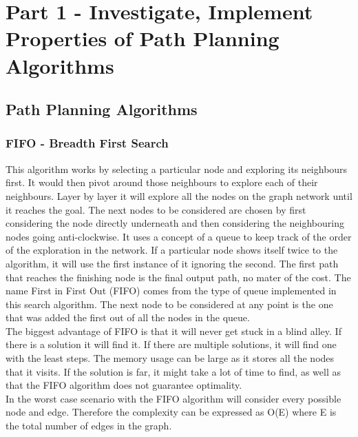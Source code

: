 \documentclass[a4paper,12pt]{article}
\begin{document}
	\pagebreak
	
	\tableofcontents
	
	\pagebreak
	
	\section{Part 1 - Investigate, Implement Properties of Path Planning Algorithms}
		
	\subsection{Path Planning Algorithms}

			\subsubsection{FIFO - Breadth First Search}

				This algorithm works by selecting a particular node and exploring its neighbours first. 
				It would then pivot around those neighbours to explore each of their neighbours. Layer by layer 
				it will explore all the nodes on the graph network until it reaches the goal. The next nodes to
				be considered are chosen by first considering the node directly underneath and then considering
				the neighbouring nodes going anti-clockwise. It uses a concept of a queue to keep track of the
				order of the exploration in the network. If a particular node shows itself twice to the algorithm,
				it will use the first instance of it ignoring the second. The first path that reaches the finishing
				node is the final output path, no mater of the cost. The name First in First Out (FIFO) comes from
				the type of queue implemented in this search algorithm. The next node to be considered at any point
				is the one that was added the first out of all the nodes in the queue. 
				\\
				The biggest advantage of FIFO is that it will never get stuck in a blind alley. If there is a 
				solution it will find it. If there are multiple solutions, it will find one with the least steps.
				The memory usage can be large as it stores all the nodes that it visits. If the solution is far,
				it might take a lot of time to find, as well as that the FIFO algorithm does not guarantee optimality.
				\\
				In the worst case scenario with the FIFO algorithm will consider every possible node and edge. Therefore
				the complexity can be expressed as O(E) where E is the total number of edges in the graph. 
			
\end{document}
